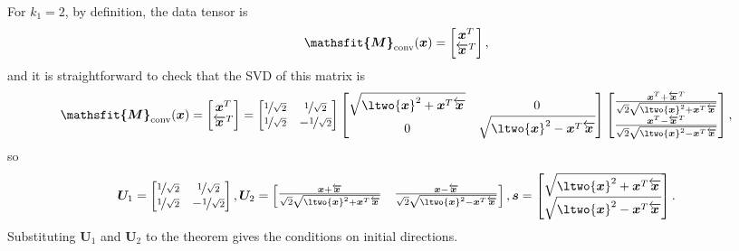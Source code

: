 \documentclass{article} %
\def\vs{{\bm{s}}}
\def\vx{{\bm{x}}}
\def\mU{{\bm{U}}}
\newcommand{\tens}[1]{\bm{\mathsfit{#1}}}
\def\tM{{\tens{M}}}
\newcommand{\tMconv}{\tM_{\rm conv}}
\begin{document}
For $k_1 = 2$, by definition, the data tensor is
\begin{align*}
    \tMconv(\vx) = \begin{bmatrix}
    \vx^T \\ \overleftarrow\vx^T
    \end{bmatrix},
\end{align*}
and it is straightforward to check that the SVD of this matrix is
\begin{align*}
    \tMconv(\vx) = \begin{bmatrix}
    \vx^T \\ \overleftarrow\vx^T
    \end{bmatrix}
    =
    \begin{bmatrix}
    \nicefrac{1}{\sqrt 2} & \nicefrac{1}{\sqrt 2}\\
    \nicefrac{1}{\sqrt 2} & -\nicefrac{1}{\sqrt 2}
    \end{bmatrix}
    \begin{bmatrix}
    \sqrt{\ltwo{\vx}^2 + \vx^T \overleftarrow \vx} & 0\\
    0 & \sqrt{\ltwo{\vx}^2 - \vx^T \overleftarrow \vx}
    \end{bmatrix}
    \begin{bmatrix}
    \frac{\vx^T + \overleftarrow\vx^T}{\sqrt 2 \sqrt{\ltwo{\vx}^2 + \vx^T \overleftarrow \vx}}\\
    \frac{\vx^T - \overleftarrow\vx^T}{\sqrt 2 \sqrt{\ltwo{\vx}^2 - \vx^T \overleftarrow \vx}}
    \end{bmatrix},
\end{align*}
so
\begin{equation*}
    \mU_1 = \begin{bmatrix}
    \nicefrac{1}{\sqrt 2} & \nicefrac{1}{\sqrt 2}\\
    \nicefrac{1}{\sqrt 2} & -\nicefrac{1}{\sqrt 2}
    \end{bmatrix},
    \mU_2 = \begin{bmatrix}
    \frac{\vx + \overleftarrow\vx}{\sqrt 2 \sqrt{\ltwo{\vx}^2 + \vx^T \overleftarrow \vx}} &
    \frac{\vx - \overleftarrow\vx}{\sqrt 2 \sqrt{\ltwo{\vx}^2 - \vx^T \overleftarrow \vx}}
    \end{bmatrix},
    \vs = \begin{bmatrix}
    \sqrt{\ltwo{\vx}^2 + \vx^T \overleftarrow \vx}\\
    \sqrt{\ltwo{\vx}^2 - \vx^T \overleftarrow \vx}
    \end{bmatrix}.
\end{equation*}
Substituting $\mU_1$ and $\mU_2$ to the theorem gives the conditions on initial directions.
\end{document}
